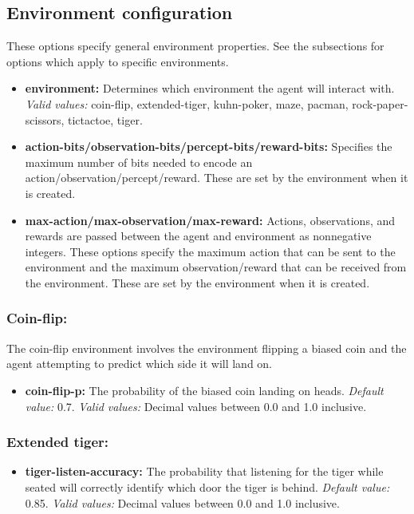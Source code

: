 \documentclass[a4paper,11pt]{article}
\begin{document}
\subsection{Environment configuration}
These options specify general environment properties. See the subsections for options which apply to specific environments.
\begin{itemize}
\item {\bf environment:} Determines which environment the agent will interact with. {\em Valid values:} coin-flip, extended-tiger, kuhn-poker, maze, pacman, rock-paper-scissors, tictactoe, tiger.

\item {\bf action-bits/observation-bits/percept-bits/reward-bits:} Specifies the maximum number of bits needed to encode an action/observation/percept/reward. These are set by the environment when it is created.

\item {\bf max-action/max-observation/max-reward:} Actions, observations, and rewards are passed between the agent and environment as nonnegative integers. These options specify the maximum action that can be sent to the environment and the maximum observation/reward that can be received from the environment. These are set by the environment when it is created.
\end{itemize}


\subsubsection{Coin-flip:}
The coin-flip environment involves the environment flipping a biased coin and the agent attempting to predict which side it will land on.
\begin{itemize}
\item {\bf coin-flip-p:} The probability of the biased coin landing on heads. {\em Default value:} 0.7. {\em Valid values:} Decimal values between 0.0 and 1.0 inclusive.
\end{itemize}

\subsubsection{Extended tiger:}
\begin{itemize}
\item {\bf tiger-listen-accuracy:} The probability that listening for the tiger while seated will correctly identify which door the tiger is behind. {\em Default value:} 0.85. {\em Valid values:} Decimal values between 0.0 and 1.0 inclusive.
\end{itemize}
\end{document}
